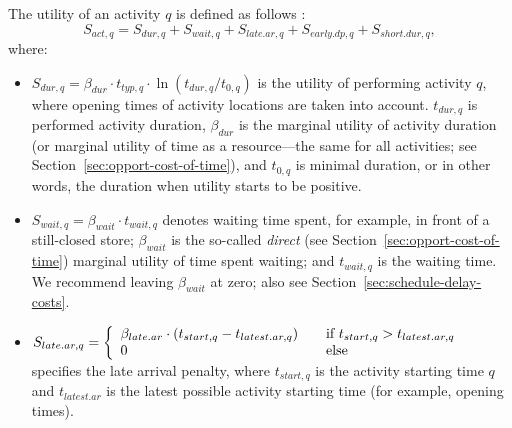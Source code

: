 The utility of an activity $q$ is defined as follows \citep[see also][p.377ff]{CharyparNagel2005ga4acts}:
\begin{equation}
S_{act,q} = S_{dur,q} + S_{wait,q} + S_{late.ar,q} + S_{early.dp,q} + S_{short.dur,q},
\label{eq:matsimUTFact}
\end{equation}
where:
\begin{itemize}\styleItemize
\item $S_{dur,q}= \beta_{dur} \cdot t_{typ,q} \cdot \ln(t_{dur,q}/t_{0,q})$ 
%
is the utility of performing activity $q$, where opening times of activity locations are taken into account. $t_{dur,q}$ is performed activity duration, $\beta_{dur}$ is the marginal utility of activity duration (or marginal utility of time as a resource---the same for all activities; see Section~\ref{sec:opport-cost-of-time}),
and $t_{0,q}$ is minimal duration, or in other words, the duration when utility starts to be positive. 
%

\medskip

\item $ S_{wait,q} = \beta_{wait} \cdot t_{wait,q}$ 
%
  denotes waiting time spent, for example, in front of a still-closed store; $\beta_{wait}$ is the so-called \emph{direct} (see Section~\ref{sec:opport-cost-of-time}) marginal utility of time spent waiting; and $t_{wait,q}$ is the waiting time.  We recommend leaving $\beta_{wait}$ at zero; also see Section~\ref{sec:schedule-delay-costs}.



\medskip

\item $S_{late.ar,q}= \left\{
  \begin{array}{l l}
    \beta_{late.ar} \cdot (t_{start,q} - t_{latest.ar,q}) & \quad \text{if $t_{start,q} > t_{latest.ar,q}$}\\
    0 & \quad \text{else}
  \end{array} \right.$
%  
  specifies the late arrival penalty, where $t_{start,q}$ is the activity starting time $q$ and $t_{latest.ar}$ is the latest possible activity starting time (for example, opening times).


\end{itemize}
